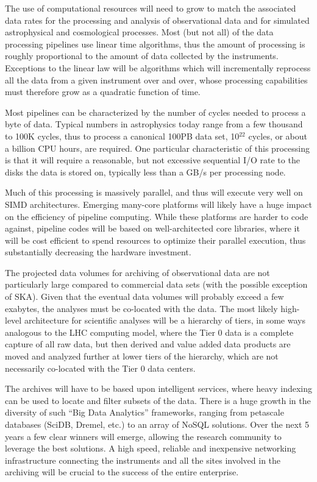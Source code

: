 The use of computational resources will need to grow to match the
associated data rates for the processing and analysis of observational
data and for simulated astrophysical and cosmological processes. Most
(but not all) of the data processing pipelines use linear time
algorithms, thus the amount of processing is roughly proportional to
the amount of data collected by the instruments. Exceptions to the
linear law will be algorithms which will incrementally reprocess all
the data from a given instrument over and over, whose processing
capabilities must therefore grow as a quadratic function of time.

Most pipelines can be characterized by the number of cycles needed to
process a byte of data. Typical numbers in astrophysics today range
from a few thousand to 100K cycles, thus to process a canonical 100PB
data set, 10$^{22}$ cycles, or about a billion CPU hours, are
required. One particular characteristic of this processing is that it
will require a reasonable, but not excessive sequential I/O rate to
the disks the data is stored on, typically less than a GB/s per
processing node.

Much of this processing is massively parallel, and thus will execute
very well on SIMD architectures. Emerging many-core platforms will
likely have a huge impact on the efficiency of pipeline
computing. While these platforms are harder to code against, pipeline
codes will be based on well-architected core libraries, where it will
be cost efficient to spend resources to optimize their parallel
execution, thus substantially decreasing the hardware investment.


The projected
data volumes for archiving of observational data 
are not particularly large compared to
commercial data sets (with the possible exception of SKA). Given that
the eventual data volumes will probably exceed a few exabytes, the
analyses must be co-located with the data.
The most likely high-level architecture for scientific analyses will
be a hierarchy of tiers, in some ways analogous to the LHC computing
model, where the Tier 0 data is a complete capture of all raw data,
but then derived and value added data products are moved and analyzed
further at lower tiers of the hierarchy, which are not necessarily
co-located with the Tier 0 data centers.

The archives will have to be based upon intelligent services, where
heavy indexing can be used to locate and filter subsets of the
data. There is a huge growth in the diversity of such ``Big Data
Analytics'' frameworks, ranging from petascale databases (SciDB,
Dremel, etc.) to an array of NoSQL solutions. Over the next 5 years a
few clear winners will emerge, allowing the research community to
leverage the best solutions. A high speed, reliable and
inexpensive networking infrastructure connecting the instruments and
all the sites involved in the archiving will be crucial to the success
of the entire enterprise.

